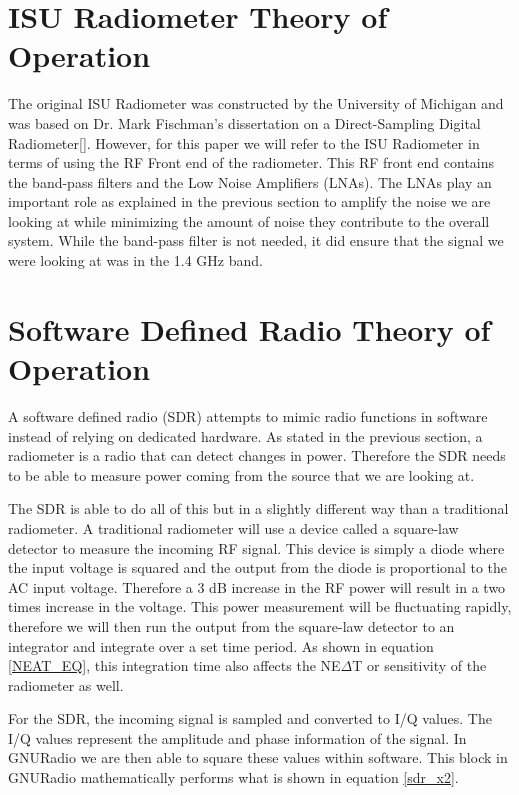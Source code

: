 \section{ISU Radiometer Theory of Operation}
The original ISU Radiometer was constructed by the University of Michigan and was based on Dr. Mark Fischman's dissertation on a Direct-Sampling Digital Radiometer[\cite{Fischman2001}].  However, for this paper we will refer to the ISU Radiometer in terms of using the RF Front end of the radiometer.  This RF front end contains the band-pass filters and the Low Noise Amplifiers (LNAs).  The LNAs play an important role as explained in the previous section to amplify the noise we are looking at while minimizing the amount of noise they contribute to the overall system.  While the band-pass filter is not needed, it did ensure that the signal we were looking at was in the 1.4 GHz band.

\section{Software Defined Radio Theory of Operation}

A software defined radio (SDR) attempts to mimic radio functions in software instead of relying on dedicated hardware.  As stated in the previous section, a radiometer is a radio that can detect changes in power.  Therefore the SDR needs to be able to measure power coming from the source that we are looking at.  

The SDR is able to do all of this but in a slightly different way than a traditional radiometer.  A traditional radiometer will use a device called a square-law detector to measure the incoming RF signal.  This device is simply a diode where the input voltage is squared and the output from the diode is proportional to the AC input voltage.  Therefore a 3 dB increase in the RF power will result in a two times increase in the voltage.  This power measurement will be fluctuating rapidly, therefore we will then run the output from the square-law detector to an integrator and integrate over a set time period.  As shown in equation \ref{NEAT_EQ}, this integration time also affects the NE$\Delta$T or sensitivity of the radiometer as well.

For the SDR, the incoming signal is sampled and converted to I/Q values.  The I/Q values represent the amplitude and phase information of the signal.  In GNURadio we are then able to square these values within software.  This block in GNURadio mathematically performs what is shown in equation \ref{sdr_x2}.

